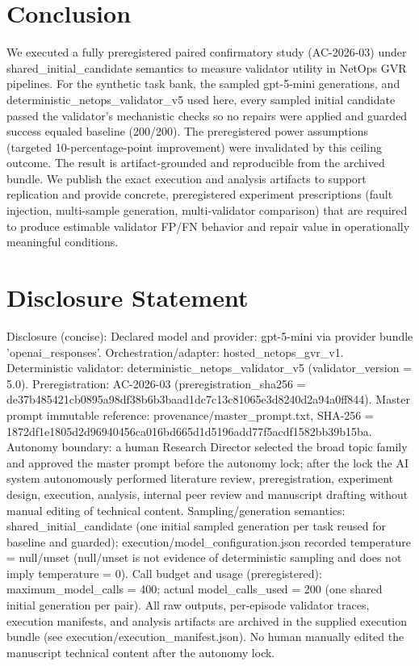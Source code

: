 \documentclass[conference]{IEEEtran}
\begin{document}
\section{Conclusion}
We executed a fully preregistered paired confirmatory study (AC-2026-03) under shared\_initial\_candidate semantics to measure validator utility in NetOps GVR pipelines. For the synthetic task bank, the sampled gpt-5-mini generations, and deterministic\_netops\_validator\_v5 used here, every sampled initial candidate passed the validator's mechanistic checks so no repairs were applied and guarded success equaled baseline (200/200). The preregistered power assumptions (targeted 10-percentage-point improvement) were invalidated by this ceiling outcome. The result is artifact-grounded and reproducible from the archived bundle. We publish the exact execution and analysis artifacts to support replication and provide concrete, preregistered experiment prescriptions (fault injection, multi-sample generation, multi-validator comparison) that are required to produce estimable validator FP/FN behavior and repair value in operationally meaningful conditions.

\section*{Disclosure Statement}
Disclosure (concise): Declared model and provider: gpt-5-mini via provider bundle 'openai\_responses'. Orchestration/adapter: hosted\_netops\_gvr\_v1. Deterministic validator: deterministic\_netops\_validator\_v5 (validator\_version = 5.0). Preregistration: AC-2026-03 (preregistration\_sha256 = de37b485\allowbreak{}421cb089\allowbreak{}5a98df38\allowbreak{}b6b3baad\allowbreak{}1dc7c13c\allowbreak{}81065e3d\allowbreak{}8240d2a9\allowbreak{}4a0ff844). Master prompt immutable reference: provenance/master\_prompt.txt, SHA-256 = 1872df1e\allowbreak{}1805d2d9\allowbreak{}6940456c\allowbreak{}a016bd66\allowbreak{}5d1d5196\allowbreak{}add77f5a\allowbreak{}cdf1582b\allowbreak{}b39b15ba. Autonomy boundary: a human Research Director selected the broad topic family and approved the master prompt before the autonomy lock; after the lock the AI system autonomously performed literature review, preregistration, experiment design, execution, analysis, internal peer review and manuscript drafting without manual editing of technical content. Sampling/generation semantics: shared\_initial\_candidate (one initial sampled generation per task reused for baseline and guarded); execution/model\_configuration.json recorded temperature = null/unset (null/unset is not evidence of deterministic sampling and does not imply temperature = 0). Call budget and usage (preregistered): maximum\_model\_calls = 400; actual model\_calls\_used = 200 (one shared initial generation per pair). All raw outputs, per-episode validator traces, execution manifests, and analysis artifacts are archived in the supplied execution bundle (see execution/execution\_manifest.json). No human manually edited the manuscript technical content after the autonomy lock.
\end{document}
